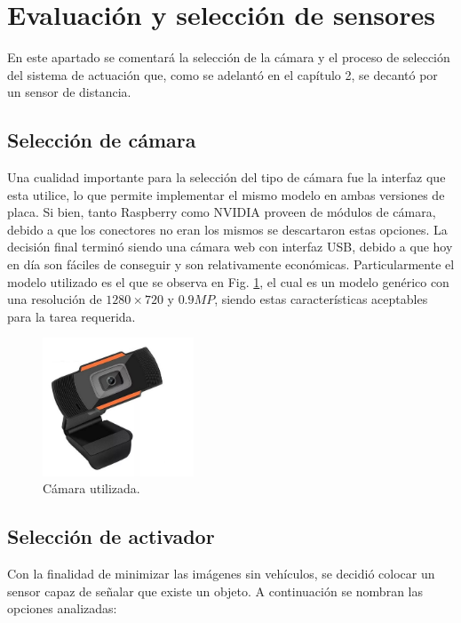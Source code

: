 \section{Evaluación y selección de sensores}

En este apartado se comentará la selección de la cámara y el proceso de selección del sistema de actuación que, como se adelantó en el capítulo 2, se decantó por un sensor de distancia.

\subsection{Selección de cámara}

Una cualidad importante para la selección del tipo de cámara fue la interfaz que esta utilice, lo que permite implementar el mismo modelo en ambas versiones de placa.
Si bien, tanto Raspberry como NVIDIA proveen de módulos de cámara, debido a que los conectores no eran los mismos se descartaron estas opciones. La decisión final terminó siendo una cámara web con interfaz USB, debido a que hoy en día son fáciles de conseguir y son relativamente económicas. Particularmente el modelo utilizado es el que se observa en Fig. \ref{fig:camara-usb}, el cual es un modelo genérico con una resolución de $1280 \times 720$ y $0.9MP$, siendo estas características aceptables para la tarea requerida.

\begin{figure}[bth]
    \centering
    \includegraphics[width=0.4\textwidth]{imgs/camara-usb.jpg}
    \caption{Cámara utilizada.}
    \label{fig:camara-usb}
\end{figure}

\subsection{Selección de activador}

Con la finalidad de minimizar las imágenes sin vehículos, se decidió colocar un sensor capaz de señalar que existe un objeto. A continuación se nombran las opciones analizadas:

